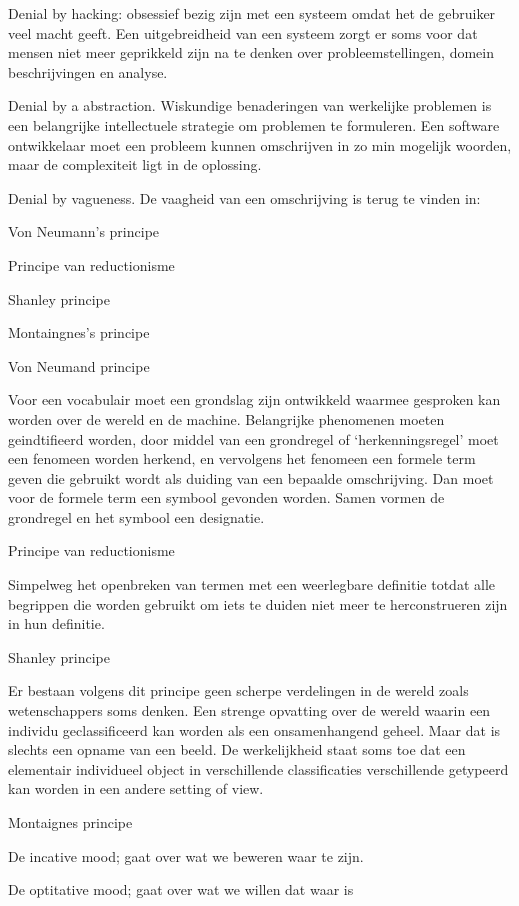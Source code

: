\documentclass{article}
\begin{document}
Denial by hacking: obsessief bezig zijn met een systeem omdat het de gebruiker veel macht geeft. Een uitgebreidheid van een systeem zorgt er soms voor dat mensen niet meer geprikkeld zijn na te denken over probleemstellingen, domein beschrijvingen en analyse. 

Denial by a abstraction. Wiskundige benaderingen van werkelijke problemen is  een belangrijke intellectuele strategie om problemen te formuleren. Een software ontwikkelaar moet een probleem kunnen omschrijven in zo min mogelijk woorden, maar de complexiteit ligt in de oplossing. 

Denial by vagueness. De vaagheid van een omschrijving is terug te vinden in: 

Von Neumann’s principe 

Principe van reductionisme 

Shanley principe 

Montaingnes’s principe 

Von Neumand principe 

Voor een vocabulair  moet een grondslag zijn ontwikkeld waarmee gesproken kan worden over de wereld en de machine. Belangrijke phenomenen moeten geindtifieerd worden, door middel van een grondregel  of ‘herkenningsregel’ moet een fenomeen worden herkend, en vervolgens het fenomeen een formele term geven die gebruikt wordt als duiding van een bepaalde omschrijving. Dan moet voor de formele term een symbool gevonden worden. Samen vormen de grondregel en het symbool een designatie. 

Principe van reductionisme 

Simpelweg het openbreken van termen met een weerlegbare definitie totdat alle begrippen die worden gebruikt om iets te duiden  niet meer te herconstrueren zijn in hun definitie. 

Shanley principe 

Er bestaan volgens dit principe geen scherpe verdelingen in de wereld zoals wetenschappers soms denken. Een strenge opvatting over de wereld waarin een individu geclassificeerd kan worden als een onsamenhangend geheel. Maar dat is slechts een opname van een beeld. De werkelijkheid staat soms toe dat een elementair individueel object in verschillende classificaties verschillende getypeerd kan worden in een andere setting of view. 

Montaignes principe 

De incative mood; gaat over wat we beweren waar te zijn. 

De optitative mood; gaat over wat we willen dat waar is 
\end{document}
